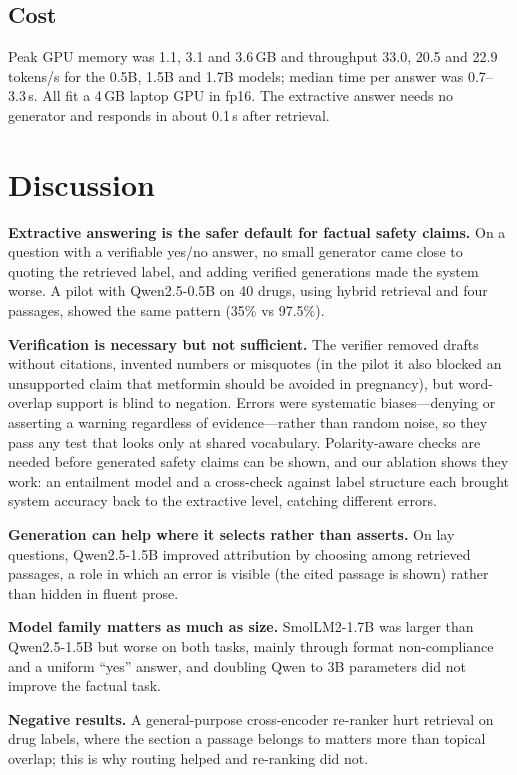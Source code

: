 \documentclass[conference]{IEEEtran}
\begin{document}
\subsection{Cost}
Peak GPU memory was 1.1, 3.1 and 3.6\,GB and throughput 33.0, 20.5 and 22.9 tokens/s for the 0.5B, 1.5B and 1.7B models; median time per answer was 0.7--3.3\,s. All fit a 4\,GB laptop GPU in fp16. The extractive answer needs no generator and responds in about 0.1\,s after retrieval.

\section{Discussion}
\textbf{Extractive answering is the safer default for factual safety claims.} On a question with a verifiable yes/no answer, no small generator came close to quoting the retrieved label, and adding verified generations made the system worse. A pilot with Qwen2.5-0.5B on 40 drugs, using hybrid retrieval and four passages, showed the same pattern (35\% vs 97.5\%).

\textbf{Verification is necessary but not sufficient.} The verifier removed drafts without citations, invented numbers or misquotes (in the pilot it also blocked an unsupported claim that metformin should be avoided in pregnancy), but word-overlap support is blind to negation. Errors were systematic biases---denying or asserting a warning regardless of evidence---rather than random noise, so they pass any test that looks only at shared vocabulary. Polarity-aware checks are needed before generated safety claims can be shown, and our ablation shows they work: an entailment model and a cross-check against label structure each brought system accuracy back to the extractive level, catching different errors.

\textbf{Generation can help where it selects rather than asserts.} On lay questions, Qwen2.5-1.5B improved attribution by choosing among retrieved passages, a role in which an error is visible (the cited passage is shown) rather than hidden in fluent prose.

\textbf{Model family matters as much as size.} SmolLM2-1.7B was larger than Qwen2.5-1.5B but worse on both tasks, mainly through format non-compliance and a uniform ``yes'' answer, and doubling Qwen to 3B parameters did not improve the factual task.

\textbf{Negative results.} A general-purpose cross-encoder re-ranker hurt retrieval on drug labels, where the section a passage belongs to matters more than topical overlap; this is why routing helped and re-ranking did not.
\end{document}
